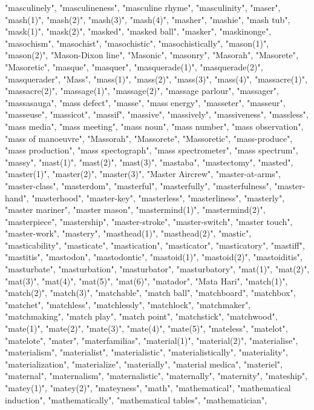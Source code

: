 "masculinely",
"masculineness",
"masculine rhyme",
"masculinity",
"maser",
"mash(1)",
"mash(2)",
"mash(3)",
"mash(4)",
"masher",
"mashie",
"mash tub",
"mask(1)",
"mask(2)",
"masked",
"masked ball",
"masker",
"maskinonge",
"masochism",
"masochist",
"masochistic",
"masochistically",
"mason(1)",
"mason(2)",
"Mason-Dixon line",
"Masonic",
"masonry",
"Masorah",
"Masorete",
"Masoretic",
"masque",
"masquer",
"masquerade(1)",
"masquerade(2)",
"masquerader",
"Mass",
"mass(1)",
"mass(2)",
"mass(3)",
"mass(4)",
"massacre(1)",
"massacre(2)",
"massage(1)",
"massage(2)",
"massage parlour",
"massager",
"massasauga",
"mass defect",
"masse",
"mass energy",
"masseter",
"masseur",
"masseuse",
"massicot",
"massif",
"massive",
"massively",
"massiveness",
"massless",
"mass media",
"mass meeting",
"mass noun",
"mass number",
"mass observation",
"mass of manoeuvre",
"Massorah",
"Massorete",
"Massoretic",
"mass-produce",
"mass production",
"mass spectograph",
"mass spectrometer",
"mass spectrum",
"massy",
"mast(1)",
"mast(2)",
"mast(3)",
"mastaba",
"mastectomy",
"masted",
"master(1)",
"master(2)",
"master(3)",
"Master Aircrew",
"master-at-arms",
"master-class",
"masterdom",
"masterful",
"masterfully",
"masterfulness",
"master-hand",
"masterhood",
"master-key",
"masterless",
"masterliness",
"masterly",
"master mariner",
"master mason",
"mastermind(1)",
"mastermind(2)",
"masterpiece",
"mastership",
"master-stroke",
"master-switch",
"master touch",
"master-work",
"mastery",
"masthead(1)",
"masthead(2)",
"mastic",
"masticability",
"masticate",
"mastication",
"masticator",
"masticatory",
"mastiff",
"mastitis",
"mastodon",
"mastodontic",
"mastoid(1)",
"mastoid(2)",
"mastoiditis",
"masturbate",
"masturbation",
"masturbator",
"masturbatory",
"mat(1)",
"mat(2)",
"mat(3)",
"mat(4)",
"mat(5)",
"mat(6)",
"matador",
"Mata Hari",
"match(1)",
"match(2)",
"match(3)",
"matchable",
"match ball",
"matchboard",
"matchbox",
"matchet",
"matchless",
"matchlessly",
"matchlock",
"matchmaker",
"matchmaking",
"match play",
"match point",
"matchstick",
"matchwood",
"mate(1)",
"mate(2)",
"mate(3)",
"mate(4)",
"mate(5)",
"mateless",
"matelot",
"matelote",
"mater",
"materfamilias",
"material(1)",
"material(2)",
"materialise",
"materialism",
"materialist",
"materialistic",
"materialistically",
"materiality",
"materialization",
"materialize",
"materially",
"material medica",
"materiel",
"maternal",
"maternalism",
"maternalistic",
"maternally",
"maternity",
"mateship",
"matey(1)",
"matey(2)",
"mateyness",
"math",
"mathematical",
"mathematical induction",
"mathematically",
"mathematical tables",
"mathematician",
